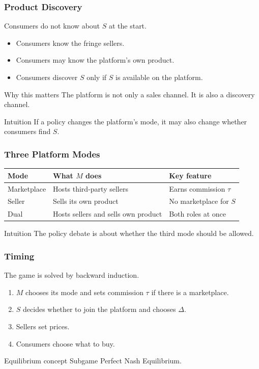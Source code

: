 \documentclass[aspectratio=169,AutoFakeBold,AutoFakeSlant]{beamer}
\begin{document}
\begin{frame}
  \frametitle{Product Discovery}
  \small
  Consumers do not know about $S$ at the start.

  \begin{itemize}
    \item Consumers know the fringe sellers.
    \item Consumers may know the platform's own product.
    \item Consumers discover $S$ only if $S$ is available on the platform.
  \end{itemize}

  \begin{block}{Why this matters}
    The platform is not only a sales channel. It is also a discovery channel.
  \end{block}

  \begin{alertblock}{Intuition}
    If a policy changes the platform's mode, it may also change whether consumers find $S$.
  \end{alertblock}
\end{frame}

\begin{frame}
  \frametitle{Three Platform Modes}
  \small
  \begin{center}
    \begin{tabular}{lll}
      \toprule
      Mode & What $M$ does & Key feature \\
      \midrule
      Marketplace & Hosts third-party sellers & Earns commission $\tau$ \\
      Seller & Sells its own product & No marketplace for $S$ \\
      Dual & Hosts sellers and sells own product & Both roles at once \\
      \bottomrule
    \end{tabular}
  \end{center}

  \begin{block}{Intuition}
    The policy debate is about whether the third mode should be allowed.
  \end{block}
\end{frame}

\begin{frame}
  \frametitle{Timing}
  \small
  The game is solved by backward induction.

  \begin{enumerate}
    \item $M$ chooses its mode and sets commission $\tau$ if there is a marketplace.
    \item $S$ decides whether to join the platform and chooses $\Delta$.
    \item Sellers set prices.
    \item Consumers choose what to buy.
  \end{enumerate}

  \begin{block}{Equilibrium concept}
    Subgame Perfect Nash Equilibrium.
  \end{block}
\end{frame}
\end{document}
